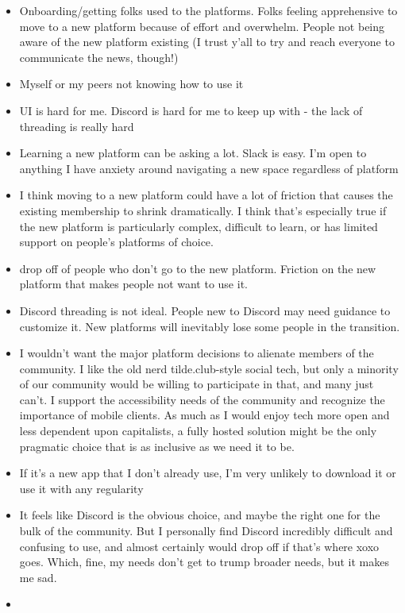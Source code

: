 \documentclass[
]{book}
\providecommand{\tightlist}{%
  \setlength{\itemsep}{0pt}\setlength{\parskip}{0pt}}
\begin{document}
\begin{itemize}
\tightlist
\item
  Onboarding/getting folks used to the platforms. Folks feeling apprehensive to move to a new platform because of effort and overwhelm. People not being aware of the new platform existing (I trust y'all to try and reach everyone to communicate the news, though!)
\item
  Myself or my peers not knowing how to use it
\item
  UI is hard for me. Discord is hard for me to keep up with - the lack of threading is really hard
\item
  Learning a new platform can be asking a lot. Slack is easy. I'm open to anything I have anxiety around navigating a new space regardless of platform
\item
  I think moving to a new platform could have a lot of friction that causes the existing membership to shrink dramatically. I think that's especially true if the new platform is particularly complex, difficult to learn, or has limited support on people's platforms of choice.
\item
  drop off of people who don't go to the new platform. Friction on the new platform that makes people not want to use it.
\item
  Discord threading is not ideal. People new to Discord may need guidance to customize it. New platforms will inevitably lose some people in the transition.
\item
  I wouldn't want the major platform decisions to alienate members of the community. I like the old nerd tilde.club-style social tech, but only a minority of our community would be willing to participate in that, and many just can't. I support the accessibility needs of the community and recognize the importance of mobile clients. As much as I would enjoy tech more open and less dependent upon capitalists, a fully hosted solution might be the only pragmatic choice that is as inclusive as we need it to be.
\item
  If it's a new app that I don't already use, I'm very unlikely to download it or use it with any regularity
\item
  It feels like Discord is the obvious choice, and maybe the right one for the bulk of the community. But I personally find Discord incredibly difficult and confusing to use, and almost certainly would drop off if that's where xoxo goes. Which, fine, my needs don't get to trump broader needs, but it makes me sad.
\item

\end{itemize}
\end{document}

